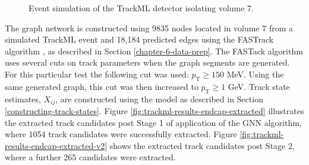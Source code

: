 \begin{figure}[htbp!] 
    \centering
    \hfill%
    \caption{Event simulation of the TrackML detector isolating volume 7.}
    \label{fig:trackml-results-endcap-nodes-sim}
\end{figure}


The graph network is constructed using 9835 nodes located in volume 7 from a simulated TrackML event and 18,184 predicted edges using the FASTrack algorithm \cite{Dmitry-fasttrack-addtest}, as described in Section \ref{chapter-6-data-prep}. The FASTack algorithm uses several cuts on track parameters when the graph segments are generated. For this particular test the following cut was used: $p_{\text{T}} \ge 150$ MeV. Using the same generated graph, this cut was then increased to $p_{\text{T}} \ge 1$ GeV. Track state estimates, $X_{ij}$, are constructed using the model as described in Section \ref{constructing-track-states}. Figure \ref{fig:trackml-results-endcap-extracted} illustrates the extracted track candidates post Stage 1 of application of the GNN algorithm, where 1054 track candidates were successfully extracted. Figure \ref{fig:trackml-results-endcap-extracted-v2} shows the extracted track candidates post Stage 2, where a further 265 candidates were extracted.

